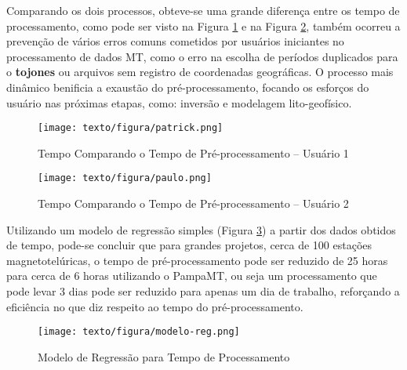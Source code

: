     Comparando os dois processos, obteve-se uma grande diferença entre os tempo de processamento, como pode ser visto na Figura \ref{tempo-pa} e na Figura \ref{tempo-pau}, também ocorreu a prevenção de vários erros comuns cometidos por usuários iniciantes no processamento de dados MT, como o erro na escolha de períodos duplicados para o \textbf{tojones} ou arquivos sem registro de coordenadas geográficas. O processo mais dinâmico benificia a exaustão do pré-processamento, focando os esforços do usuário nas próximas etapas, como: inversão e modelagem lito-geofísico. 
        
    
    \begin{figure}[H]
        \caption{Tempo Comparando o Tempo de Pré-processamento -- Usuário 1}
            \begin{center}
                \texttt{[image: texto/figura/patrick.png]}
            \end{center}
        \legend{\Fonte{\oautor}}
        \label{tempo-pa}
    \end{figure}
    
    \begin{figure}[H]
        \caption{Tempo Comparando o Tempo de Pré-processamento -- Usuário 2}
            \begin{center}
                \texttt{[image: texto/figura/paulo.png]}
            \end{center}
        \legend{\Fonte{\oautor}}
        \label{tempo-pau}
    \end{figure}
    
    
    Utilizando um modelo de regressão simples (Figura \ref{modelo-reg}) a partir dos dados obtidos de tempo, pode-se concluir que para grandes projetos, cerca de 100 estações magnetotelúricas, o tempo de pré-processamento pode ser reduzido de 25 horas para cerca de 6 horas utilizando o PampaMT, ou seja um processamento que pode levar 3 dias pode ser reduzido para apenas um dia de trabalho, reforçando a eficiência no que diz respeito ao tempo do pré-processamento.   
    
    \begin{figure}[H]
        \caption{Modelo de Regressão para Tempo de Processamento}
            \begin{center}
                \texttt{[image: texto/figura/modelo-reg.png]}
            \end{center}
        \legend{\Fonte{\oautor}}
        \label{modelo-reg}
    \end{figure}      
        
